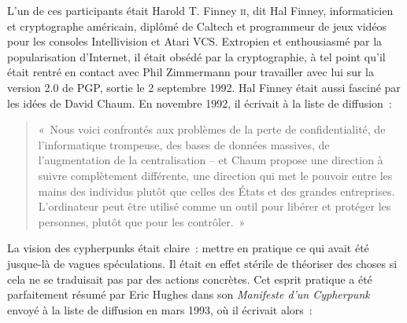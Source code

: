 L'un de ces participants était Harold T. Finney \textsc{ii}, dit Hal Finney, informaticien et cryptographe américain, diplômé de Caltech et programmeur de jeux vidéos pour les consoles Intellivision et Atari VCS. Extropien et enthousiasmé par la popularisation d'Internet, il était obsédé par la cryptographie, à tel point qu'il était rentré en contact avec Phil Zimmermann pour travailler avec lui sur la version 2.0 de PGP, sortie le 2 septembre 1992. Hal Finney était aussi fasciné par les idées de David Chaum. En novembre 1992, il écrivait à la liste de diffusion~:

\begin{quote}
«~Nous voici confrontés aux problèmes de la perte de confidentialité, de l'informatique trompeuse, des bases de données massives, de l'augmentation de la centralisation -- et Chaum propose une direction à suivre complètement différente, une direction qui met le pouvoir entre les mains des individus plutôt que celles des États et des grandes entreprises. L'ordinateur peut être utilisé comme un outil pour libérer et protéger les personnes, plutôt que pour les contrôler.~»
\end{quote}

La vision des cypherpunks était claire~: mettre en pratique ce qui avait été jusque-là de vagues spéculations. Il était en effet stérile de théoriser des choses si cela ne se traduisait pas par des actions concrètes. Cet esprit pratique a été parfaitement résumé par Eric Hughes dans son \emph{Manifeste d'un Cypherpunk} envoyé à la liste de diffusion en mars 1993, où il écrivait alors~:

